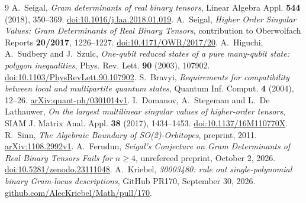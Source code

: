 \documentclass[11pt]{article}
\begin{document}
\begin{thebibliography}{9}
 A.~Seigal, \emph{Gram determinants of real binary tensors}, Linear Algebra Appl. \textbf{544} (2018), 350--369.
\href{https://doi.org/10.1016/j.laa.2018.01.019}{doi:10.1016/j.laa.2018.01.019}.
 A.~Seigal, \emph{Higher Order Singular Values: Gram Determinants of Real Binary Tensors}, contribution to Oberwolfach Reports \textbf{20/2017}, 1226--1227.
\href{https://doi.org/10.4171/OWR/2017/20}{doi:10.4171/OWR/2017/20}.
 A.~Higuchi, A.~Sudbery and J.~Szulc, \emph{One-qubit reduced states of a pure many-qubit state: polygon inequalities}, Phys. Rev. Lett. \textbf{90} (2003), 107902.
\href{https://doi.org/10.1103/PhysRevLett.90.107902}{doi:10.1103/PhysRevLett.90.107902}.
 S.~Bravyi, \emph{Requirements for compatibility between local and multipartite quantum states}, Quantum Inf. Comput. \textbf{4} (2004), 12--26.
\href{https://arxiv.org/abs/quant-ph/0301014v1}{arXiv:quant-ph/0301014v1}.
 I.~Domanov, A.~Stegeman and L.~De Lathauwer, \emph{On the largest multilinear singular values of higher-order tensors}, SIAM J. Matrix Anal. Appl. \textbf{38} (2017), 1434--1453.
\href{https://doi.org/10.1137/16M110770X}{doi:10.1137/16M110770X}.
 R.~Sinn, \emph{The Algebraic Boundary of SO(2)-Orbitopes}, preprint, 2011.
\href{https://arxiv.org/abs/1108.2992v1}{arXiv:1108.2992v1}.
 A.~Ferudun, \emph{Seigal's Conjecture on Gram Determinants of Real Binary Tensors Fails for \(n\geq4\)}, unrefereed preprint, October 2, 2026.
\href{https://doi.org/10.5281/zenodo.23111048}{doi:10.5281/zenodo.23111048}.
 A.~Kriebel, \emph{30003480: rule out single-polynomial binary Gram-locus descriptions}, GitHub PR170, September 30, 2026.
\href{https://github.com/AlecKriebel/Math/pull/170}{github.com/AlecKriebel/Math/pull/170}.
\end{thebibliography}
\end{document}
